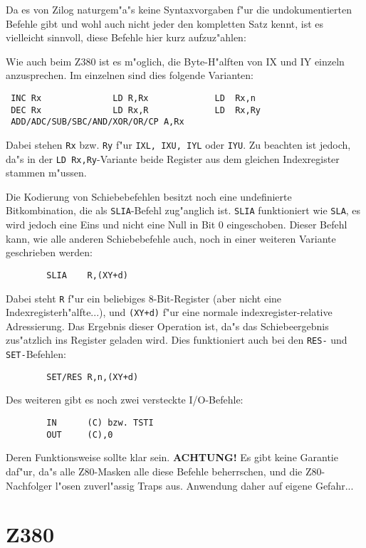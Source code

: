 \documentclass[12pt,a4paper,twoside]{report}
\newcommand{\bb}[1]{{\bf #1}}
\newcommand{\tty}[1]{{\tt #1}}
\begin{document}
Da es von Zilog naturgem"a"s keine Syntaxvorgaben f"ur die undokumentierten
Befehle gibt und wohl auch nicht jeder den kompletten Satz kennt,
ist es vielleicht sinnvoll, diese Befehle hier kurz aufzuz"ahlen:
\par
Wie auch beim Z380 ist es m"oglich, die Byte-H"alften von IX und IY
einzeln anzusprechen.  Im einzelnen sind dies folgende Varianten:
\begin{verbatim}
 INC Rx              LD R,Rx             LD  Rx,n
 DEC Rx              LD Rx,R             LD  Rx,Ry
 ADD/ADC/SUB/SBC/AND/XOR/OR/CP A,Rx
\end{verbatim}
Dabei stehen \tty{Rx} bzw. \tty{Ry} f"ur \tty{IXL, IXU, IYL} oder
\tty{IYU}.  Zu beachten ist jedoch, da"s in der \tty{LD Rx,Ry}-Variante
beide Register aus dem gleichen Indexregister stammen m"ussen.
\par
Die Kodierung von Schiebebefehlen besitzt noch eine undefinierte
Bitkombination, die als \tty{SLIA}-Befehl zug"anglich ist.  \tty{SLIA}
funktioniert wie \tty{SLA}, es wird jedoch eine Eins und nicht eine Null
in Bit 0 eingeschoben.  Dieser Befehl kann, wie alle anderen
Schiebebefehle auch, noch in einer weiteren Variante geschrieben
werden:
\begin{verbatim}
        SLIA    R,(XY+d)
\end{verbatim}
Dabei steht \tty{R} f"ur ein beliebiges 8-Bit-Register (aber nicht eine
Indexregisterh"alfte...), und \tty{(XY+d)} f"ur eine normale
indexregister-relative Adressierung.  Das Ergebnis dieser Operation
ist, da"s das Schiebeergebnis zus"atzlich ins Register geladen wird.
Dies funktioniert auch bei den \tty{RES-} und \tty{SET-}Befehlen:
\begin{verbatim}
        SET/RES R,n,(XY+d)
\end{verbatim}
Des weiteren gibt es noch zwei versteckte I/O-Befehle:
\begin{verbatim}
        IN      (C) bzw. TSTI
        OUT     (C),0
\end{verbatim}
Deren Funktionsweise sollte klar sein.  \bb{ACHTUNG!} Es gibt keine
Garantie daf"ur, da"s alle Z80-Masken alle diese Befehle beherrschen,
und die Z80-Nachfolger l"osen zuverl"assig Traps aus.  Anwendung
daher auf eigene Gefahr...


\section{Z380}
\end{document}
